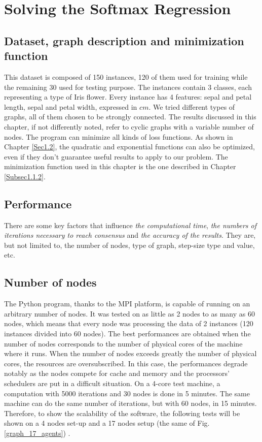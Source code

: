 \documentclass[a4paper,11pt,oneside]{book}
\begin{document}
\section{Solving the Softmax Regression}
\subsection{Dataset, graph description and minimization function} \label{Sec2.1}
This dataset is composed of 150 instances, 120 of them used for training while the remaining 30 used for testing purpose. The instances contain 3 classes, each representing a type of Iris flower. Every instance has 4 features: sepal and petal length, sepal and petal width, expressed in $cm$. We tried different types of graphs, all of them chosen to be strongly connected. The results discussed in this chapter, if not differently noted, refer to cyclic graphs with a variable number of nodes. The program can minimize all kinds of loss functions. As shown in Chapter \ref{Sec1.2}, the quadratic and exponential functions can also be optimized, even if they don't guarantee useful results to apply to our problem. The minimization function used in this chapter is the one described in Chapter \ref{Subsec1.1.2}.

\subsection{Performance} \label{Sec2.2}
There are some key factors that influence \textit{the computational time}, \textit{the numbers of iterations necessary to reach consensus} and \textit{the accuracy of the results}. They are, but not limited to, the number of nodes, type of graph, step-size type and value, etc. \\

\subsection{Number of nodes} \label{Subsec2.2.1}
The Python program, thanks to the MPI platform, is capable of running on an arbitrary number of nodes. It was tested on as little as 2 nodes to as many as 60 nodes, which means that every node was processing the data of 2 instances (120 instances divided into 60 nodes). The best performances are obtained when the number of nodes corresponds to the number of physical cores of the machine where it runs. When the number of nodes exceeds greatly the number of physical cores, the resources are oversubscribed. In this case, the performances degrade notably as the nodes compete for cache and memory and the processors' schedulers are put in a difficult situation. On a 4-core test machine, a computation with 5000 iterations and 30 nodes is done in 5 minutes. The same machine can do the same number of iterations, but with 60 nodes, in 15 minutes. Therefore, to show the scalability of the software,  the following tests will be shown on a 4 nodes set-up and a 17 nodes setup (the same of Fig. \ref{graph_17_agents}) . \\
\end{document}
